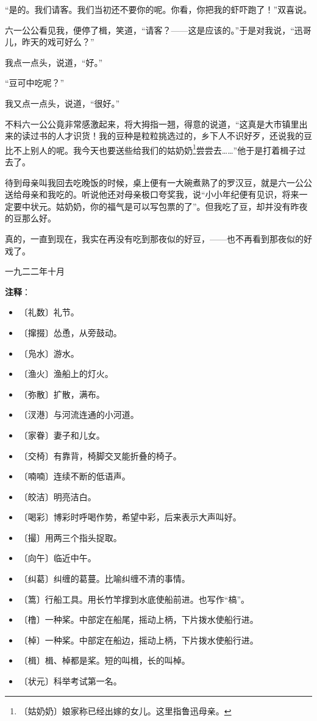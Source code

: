 \documentclass[12pt,UTF-8,openany]{ctexbook}
\begin{document}
\begin{normalsize}
    “是的。我们请客。我们当初还不要你的呢。你看，你把我的虾吓跑了！”双喜说。
    
    六一公公看见我，便停了楫，笑道，“请客？——这是应该的。”于是对我说，“迅哥儿，昨天的戏可好么？”
    
    我点一点头，说道，“好。”
    
    “豆可中吃呢？”
    
    我又点一点头，说道，“很好。”
    
    不料六一公公竟非常感激起来，将大拇指一翘，得意的说道，“这真是大市镇里出来的读过书的人才识货！我的豆种是粒粒挑选过的，乡下人不识好歹，还说我的豆比不上别人的呢。我今天也要送些给我们的姑奶奶\footnote{〔姑奶奶〕娘家称已经出嫁的女儿。这里指鲁迅母亲。}尝尝去……”他于是打着楫子过去了。
    
    待到母亲叫我回去吃晚饭的时候，桌上便有一大碗煮熟了的罗汉豆，就是六一公公送给母亲和我吃的。听说他还对母亲极口夸奖我，说“小小年纪便有见识，将来一定要中状元。姑奶奶，你的福气是可以写包票的了”。但我吃了豆，却并没有昨夜的豆那么好。
    
    真的，一直到现在，我实在再没有吃到那夜似的好豆，——也不再看到那夜似的好戏了。
    
    \hfill 一九二二年十月
    
\end{normalsize}


\newpage

\textbf{注释}：

\vspace{-1em}

\begin{itemize}
    \setlength\itemsep{-0.2em}
    \item 〔礼数〕礼节。
    \item 〔撺掇〕怂恿，从旁鼓动。
    \item 〔凫水〕游水。
    \item 〔渔火〕渔船上的灯火。
    \item 〔弥散〕扩散，满布。
    \item 〔汊港〕与河流连通的小河道。
    \item 〔家眷〕妻子和儿女。
    \item 〔交椅〕有靠背，椅脚交叉能折叠的椅子。
    \item 〔喃喃〕连续不断的低语声。
    \item 〔皎洁〕明亮洁白。
    \item 〔喝彩〕博彩时呼喝作势，希望中彩，后来表示大声叫好。
    \item 〔撮〕用两三个指头捉取。
    \item 〔向午〕临近中午。
    \item 〔纠葛〕纠缠的葛蔓。比喻纠缠不清的事情。
    \item 〔篙〕行船工具。用长竹竿撑到水底使船前进。也写作“槁”。
    \item 〔橹〕一种桨。中部定在船尾，摇动上柄，下片拨水使船行进。
    \item 〔棹〕一种桨。中部定在船边，摇动上柄，下片拨水使船行进。
    \item 〔楫〕楫、棹都是桨。短的叫楫，长的叫棹。
    \item 〔状元〕科举考试第一名。
\end{itemize}
\end{document}
